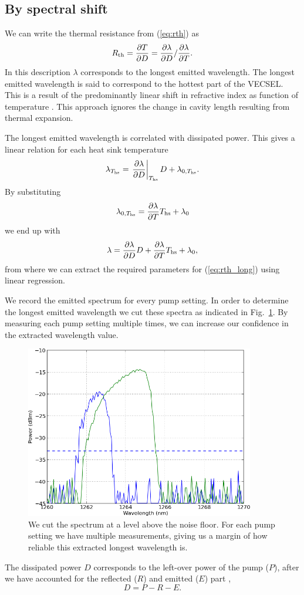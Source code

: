 \subsection{By spectral shift}
\label{sec:rth:lambda}

We can write the thermal resistance from (\ref{eq:rth})
as \cite{Heinen2012,Giet2008}
\begin{equation}
R_\mathrm{th} = \frac{\partial T}{\partial D} = \frac{\partial \lambda}{\partial D}/\frac{\partial \lambda}{\partial T}.
\label{eq:rth_long}
\end{equation}
In this description
$\lambda$ corresponds to
the longest emitted wavelength.
The longest emitted wavelength is said to
correspond to the hottest part of the VECSEL.
This is a result of the predominantly linear shift
in refractive index
as function of temperature \cite{Heinen2012}.
This approach ignores
the change in cavity length
resulting from thermal expansion.

The longest emitted wavelength
is correlated
with dissipated power.
This gives a linear relation
for each heat sink temperature
\begin{equation}
\lambda_{T_\mathrm{hs}} = \left.\frac{\partial \lambda}{\partial D}\right|_{T_\mathrm{hs}} D + \lambda_{0,T_\mathrm{hs}}.
\end{equation}
By substituting
\begin{equation}
\lambda_{0,T_\mathrm{hs}} = \frac{\partial \lambda}{\partial T} T_\mathrm{hs} + \lambda_0
\end{equation}
we end up with \cite{Heinen2012}
\begin{equation}
\lambda = \frac{\partial \lambda}{\partial D} D + \frac{\partial \lambda}{\partial T} T_\mathrm{hs} + \lambda_0,
\label{eq:rth_fit}
\end{equation}
from where we can extract
the required parameters for (\ref{eq:rth_long})
using linear regression.

We record the emitted spectrum
for every pump setting.
In order to determine
the longest emitted wavelength
we cut
these spectra
as indicated
in Fig.~\ref{img:longest_wavelength}.
By measuring each pump setting multiple times,
we can increase our confidence
in the extracted wavelength value.

\begin{figure}
\centering
\includegraphics[width=10cm]{img/longest_wavelength.png}
\caption{We cut the spectrum
at a level
above the noise floor.
For each pump setting
we have multiple measurements,
giving us a margin
of how reliable this extracted
longest wavelength is.}
\label{img:longest_wavelength}
\end{figure}

The dissipated power $D$
corresponds to the left-over power
of the pump ($P$),
after we have accounted for the
reflected ($R$) and emitted ($E$) part
\cite{Heinen2012},
\begin{equation}
D = P - R - E.
\label{eq:dissip}
\end{equation}